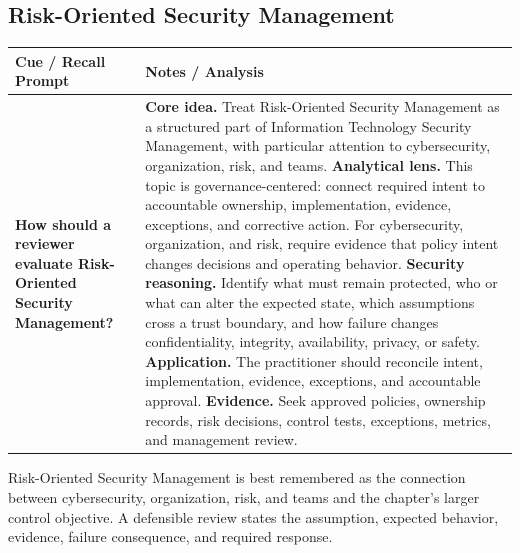 \documentclass[11pt]{article}
\newcommand{\CornellHeader}{%
\rowcolor{Navy}\color{white}\bfseries Cue / Recall Prompt & \color{white}\bfseries Notes / Analysis\\\hline}
\newcommand{\CornellRow}[2]{%
\cellcolor{CueGray}\RaggedRight\textbf{#1} & \RaggedRight #2\\\hline}
\begin{document}
\subsection*{Risk-Oriented Security Management}
\begin{longtable}{>{\RaggedRight\arraybackslash}p{}|>{\RaggedRight\arraybackslash}p{}}
\CornellHeader
\CornellRow{How should a reviewer evaluate Risk-Oriented Security Management?}{\textbf{Core idea.} Treat Risk-Oriented Security Management as a structured part of Information Technology Security Management, with particular attention to cybersecurity, organization, risk, and teams. \textbf{Analytical lens.} This topic is governance-centered: connect required intent to accountable ownership, implementation, evidence, exceptions, and corrective action. For cybersecurity, organization, and risk, require evidence that policy intent changes decisions and operating behavior. \textbf{Security reasoning.} Identify what must remain protected, who or what can alter the expected state, which assumptions cross a trust boundary, and how failure changes confidentiality, integrity, availability, privacy, or safety. \textbf{Application.} The practitioner should reconcile intent, implementation, evidence, exceptions, and accountable approval. \textbf{Evidence.} Seek approved policies, ownership records, risk decisions, control tests, exceptions, metrics, and management review.}
\end{longtable}
\begin{topicsummary}
Risk-Oriented Security Management is best remembered as the connection between cybersecurity, organization, risk, and teams and the chapter's larger control objective. A defensible review states the assumption, expected behavior, evidence, failure consequence, and required response.
\end{topicsummary}
\end{document}
